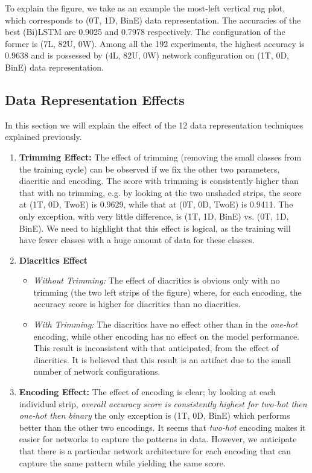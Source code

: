 {To explain the figure, we take as an example the most-left vertical rug plot, which corresponds to (0T, 1D, BinE) data representation. The accuracies of the best (Bi)LSTM are 0.9025 and 0.7978 respectively. The configuration of the former is (7L, 82U, 0W). Among all the 192 experiments, the highest accuracy is 0.9638 and is possessed by (4L, 82U, 0W) network configuration on (1T, 0D, BinE) data representation.

\subsection{Data Representation Effects}

In this section we will explain the effect of the 12 data representation techniques explained previously.

\begin{enumerate}
 \item \textbf{Trimming Effect:} The effect of trimming (removing the small classes from the training cycle) can be observed if we fix the other two parameters, diacritic and encoding. The score with trimming is consistently higher than that with no trimming, e.g. by looking at the two unshaded strips, the score at (1T, 0D, TwoE) is 0.9629, while that at (0T, 0D, TwoE) is 0.9411. The only exception, with very little difference, is (1T, 1D, BinE) vs. (0T, 1D, BinE). We need to highlight that this effect is logical, as the training will have fewer classes with a huge amount of data for these classes.
 \item \textbf{Diacritics Effect}
 \begin{itemize}
 \item \textit{Without Trimming:} The effect of diacritics is obvious only with no trimming (the two left strips of the figure) where, for each encoding, the accuracy score is higher for diacritics than no diacritics.
 \item \textit{With Trimming:} The diacritics have no effect other than in the \textit{one-hot} encoding, while other encoding has no effect on the model performance. This result is inconsistent with that anticipated, from the effect of diacritics. It is believed that this result is an artifact due to the small number of network configurations.

 \end{itemize} 
 \item \textbf{Encoding Effect:} The effect of encoding is clear; by looking at each individual strip, \textit{overall accuracy score is consistently highest for \textit{two-hot} then \textit{one-hot} then \textit{binary}} the only exception is (1T, 0D, BinE) which performs better than the other two encodings. It seems that \textit{two-hot} encoding makes it easier for networks to capture the patterns in data. However, we anticipate that there is a particular network architecture for each encoding that can capture the same pattern while yielding the same score.
\end{enumerate}



}
